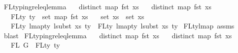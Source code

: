 \begin{isabellebody}
\endisadelimproof
\isanewline
\isanewline
{}\isamarkupfalse%
\ FL{\isacharunderscore}{\kern0pt}typing{\isacharunderscore}{\kern0pt}rel{\isacharunderscore}{\kern0pt}eq{\isacharunderscore}{\kern0pt}lemma{}{\isacharcolon}{\kern0pt}\isanewline
\ \ \ {\isachardoublequoteopen}distinct\ {\isacharparenleft}{\kern0pt}map\ fst\ xs{\isacharparenright}{\kern0pt}{\isachardoublequoteclose}\isanewline
\ \ \ {\isachardoublequoteopen}distinct\ {\isacharparenleft}{\kern0pt}map\ fst\ xs{}{\isacharparenright}{\kern0pt}{\isachardoublequoteclose}\isanewline
\ \ \ {\isachardoublequoteopen}FLty\ ty\ {\isacharequal}{\kern0pt}\ set\ {\isacharparenleft}{\kern0pt}map\ fst\ xs{}{\isacharparenright}{\kern0pt}{\isachardoublequoteclose}\isanewline
\ \ \ {\isachardoublequoteopen}set\ xs{}\ {\isasymsubseteq}\ set\ xs{\isachardoublequoteclose}\isanewline
\ \ \ {\isachardoublequoteopen}FLty\ {\isacharparenleft}{\kern0pt}lmap{\isacharunderscore}{\kern0pt}ty\ {\isacharparenleft}{\kern0pt}lsubst\ xs{\isacharparenright}{\kern0pt}\ ty{\isacharparenright}{\kern0pt}\ {\isacharequal}{\kern0pt}\ FLty\ {\isacharparenleft}{\kern0pt}lmap{\isacharunderscore}{\kern0pt}ty\ {\isacharparenleft}{\kern0pt}lsubst\ xs{}{\isacharparenright}{\kern0pt}\ ty{\isacharparenright}{\kern0pt}{\isachardoublequoteclose}\isanewline
%
\isadelimproof
%
\endisadelimproof
%
\isatagproof
{}\isamarkupfalse%
\ FL{\isacharunderscore}{\kern0pt}ty{\isacharunderscore}{\kern0pt}lmap{}\ assms{\isacharparenleft}{\kern0pt}{}{\isacharcomma}{\kern0pt}{}{\isacharcomma}{\kern0pt}{}{\isacharcomma}{\kern0pt}{}{\isacharparenright}{\kern0pt}\ \isamarkupfalse%
\ blast%
\endisatagproof
{\isafoldproof}%
%
\isadelimproof
\isanewline
%
\endisadelimproof
\isanewline
\isanewline
{}\isamarkupfalse%
\ FL{\isacharunderscore}{\kern0pt}typing{\isacharunderscore}{\kern0pt}rel{\isacharunderscore}{\kern0pt}eq{\isacharunderscore}{\kern0pt}lemma{}{\isacharcolon}{\kern0pt}\isanewline
\ \ \ {\isachardoublequoteopen}distinct\ {\isacharparenleft}{\kern0pt}map\ fst\ xs{\isacharparenright}{\kern0pt}{\isachardoublequoteclose}\isanewline
\ \ \ {\isachardoublequoteopen}distinct\ {\isacharparenleft}{\kern0pt}map\ fst\ xs{}{\isacharparenright}{\kern0pt}{\isachardoublequoteclose}\isanewline
\ \ \ {\isachardoublequoteopen}FL\ G\ {\isacharequal}{\kern0pt}\ FLty\ ty{\isachardoublequoteclose}\isanewline

\end{isabellebody}
